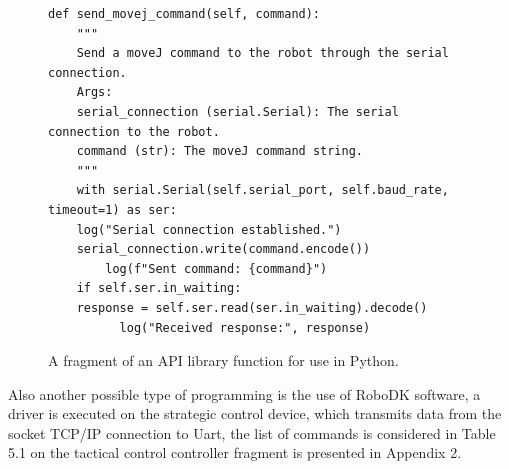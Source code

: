 \begin{figure}[H]
	\centering

	\begin{verbatim}
def send_movej_command(self, command):
    """
    Send a moveJ command to the robot through the serial connection.
    Args:       
    serial_connection (serial.Serial): The serial connection to the robot.
    command (str): The moveJ command string.
    """
    with serial.Serial(self.serial_port, self.baud_rate, timeout=1) as ser:
  	log("Serial connection established.")
    serial_connection.write(command.encode())
    	log(f"Sent command: {command}")
    if self.ser.in_waiting:
	response = self.ser.read(ser.in_waiting).decode()
          log("Received response:", response)
	\end{verbatim}
	\caption{A fragment of an API library function for use in Python.}\label{CodePython2}
\end{figure}


Also another possible type of programming is the use of RoboDK software, a driver is executed on the strategic control device, which transmits data from the socket TCP/IP connection to Uart, the list of commands is considered in Table 5.1 on the tactical control controller fragment is presented in Appendix 2.


